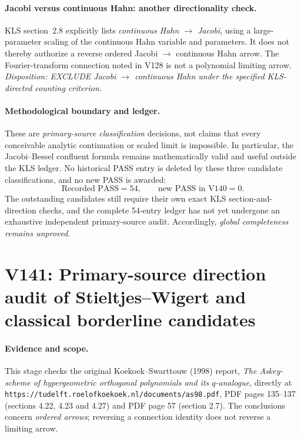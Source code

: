 \documentclass[11pt]{article}
\begin{document}
\paragraph{Jacobi versus continuous Hahn: another directionality check.}
KLS section~2.8 explicitly lists \emph{continuous Hahn $\to$ Jacobi},
using a large-parameter scaling of the continuous Hahn variable and
parameters.  It does not thereby authorize a reverse ordered
Jacobi $\to$ continuous Hahn arrow.  The Fourier-transform connection
noted in V128 is not a polynomial limiting arrow.
\emph{Disposition: EXCLUDE Jacobi $\to$ continuous Hahn under the
specified KLS-directed counting criterion.}

\paragraph{Methodological boundary and ledger.}
These are \emph{primary-source classification} decisions, not claims
that every conceivable analytic continuation or scaled limit is
impossible.  In particular, the Jacobi--Bessel confluent formula
remains mathematically valid and useful outside the KLS ledger.
No historical PASS entry is deleted by these three candidate
classifications, and no new PASS is awarded:
\[
 \boxed{\text{Recorded PASS}=54,\qquad
        \text{new PASS in V140}=0.}
\]
The outstanding candidates still require their own exact KLS
section-and-direction checks, and the complete 54-entry ledger has
not yet undergone an exhaustive independent primary-source audit.
Accordingly, \emph{global completeness remains unproved}.

\clearpage
\section{V141: Primary-source direction audit of Stieltjes--Wigert and classical borderline candidates}
\label{sec:v141-kls-directions}

\paragraph{Evidence and scope.}
This stage checks the original Koekoek--Swarttouw (1998) report,
\emph{The Askey-scheme of hypergeometric orthogonal polynomials and its
$q$-analogue}, directly at
\texttt{https://tudelft.roelofkoekoek.nl/documents/as98.pdf},
PDF pages 135--137 (sections 4.22, 4.23 and 4.27) and PDF page 57
(section 2.7).  The conclusions concern \emph{ordered arrows};
reversing a connection identity does not reverse a limiting arrow.
\end{document}
